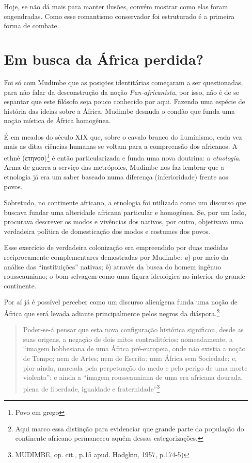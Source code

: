 Hoje, se não dá mais para manter ilusões, convém mostrar como elas foram
engendradas. Como esse romantismo conservador foi estruturado é a
primeira forma de combate.

\chapter{Em busca da África perdida?}

Foi só com Mudimbe que as posições identitárias começaram a ser
questionadas, para não falar da desconstrução da noção
\emph{Pan-africanista}, por isso, não é de se espantar que este filósofo
seja pouco conhecido por aqui. Fazendo uma espécie de história das
ideias sobre a África, Mudimbe desnuda o condão que funda uma noção
mística de África homogênea.

É em meados do século XIX que, sobre o cavalo branco do iluminismo, cada
vez mais as ditas ciências humanas se voltam para a compreensão dos
africanos. A ethnè (ετηνοσ)\footnote{Povo em grego} é então
particularizada e funda uma nova doutrina: a \emph{etnologia}. Arma de
guerra a serviço das metrópoles, Mudimbe nos faz lembrar que a etnologia
já era um saber baseado numa diferença (inferioridade) frente aos povos.

Sobretudo, no continente africano, a etnologia foi utilizada como um
discurso que buscava fundar uma alteridade africana particular e
homogênea. Se, por um lado, procurava descrever os modos e vivências dos
nativos, por outro, objetivava uma verdadeira política de domesticação
dos modos e costumes dos povos.

Esse exercício de verdadeira colonização era empreendido por duas
medidas reciprocamente complementares demostradas por Mudimbe: \emph{a})
por meio da análise das ``instituições'' nativas; \emph{b}) através da
busca do homem ingênuo rousseauniano; o bom selvagem como uma figura
ideológica no interior do grande continente.

Por aí já é possível perceber como um discurso alienígena funda uma
noção de África que será levada adiante principalmente pelos negros da
diáspora.\footnote{Aqui marco essa distinção para evidenciar que grande
  parte da população do continente africano permaneceu aquém dessas
  categorizações.}

\begin{quote}
Poder-se-á pensar que esta nova configuração histórica significou, desde
as suas origens, a negação de dois mitos contraditórios: nomeadamente, a
``imagem hobbesiana de uma África pré-europeia, onde não existia a noção
de Tempo; nem de Artes; nem de Escrita; uma África sem Sociedade; e,
pior ainda, marcada pela perpetuação do medo e pelo perigo de uma morte
violenta'': e ainda a ``imagem rousseauniana de uma era africana
dourada, plena de liberdade, igualdade e fraternidade''\footnote{MUDIMBE,
  op. cit., p.15 apud. Hodgkin, 1957, p.174-5)}
\end{quote}

